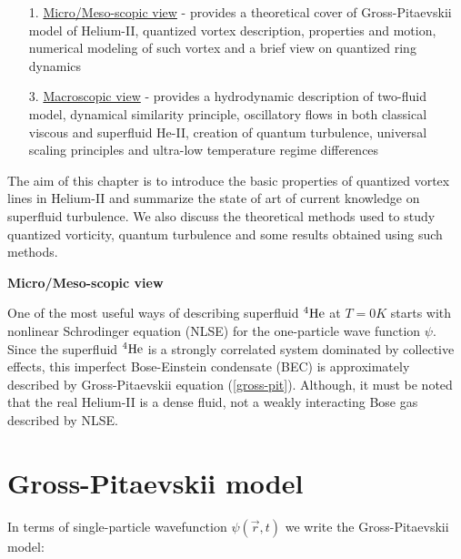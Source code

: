 \begin{itemize}
	\item[1.] \underline{Micro/Meso-scopic view} - provides a theoretical cover of Gross-Pitaevskii model of Helium-II, quantized vortex description, properties and motion, numerical modeling of such vortex and a brief view on quantized ring dynamics

	\item[3.] \underline{Macroscopic view} - provides a hydrodynamic description of two-fluid model, dynamical similarity principle, oscillatory flows in both classical viscous and superfluid He-II, creation of quantum turbulence, universal scaling principles and ultra-low temperature regime differences

\end{itemize}

The aim of this chapter is to introduce the basic properties of quantized vortex lines in Helium-II and summarize the state of art of current knowledge on superfluid turbulence. We also discuss the theoretical methods used to study quantized vorticity, quantum turbulence and some results obtained using such methods.


\newpage

{\Huge \bfseries Micro/Meso-scopic view}
\vspace{0.3cm}

One of the most useful ways of describing superfluid ${}^4\mathrm{He}$ at $T=0\unit{K}$ starts with nonlinear Schrodinger equation (NLSE) for the one-particle wave function $\psi$. Since the superfluid ${}^4\mathrm{He}$ is a strongly correlated system dominated by collective effects, this imperfect Bose-Einstein condensate (BEC) is approximately described by Gross-Pitaevskii equation (\ref{gross-pit}). Although, it must be noted that the real Helium-II is a dense fluid, not a weakly interacting Bose gas described by NLSE.


\section{Gross-Pitaevskii model}

In terms of single-particle wavefunction $\psi(\vec{r},t)$ we write the Gross-Pitaevskii model:

